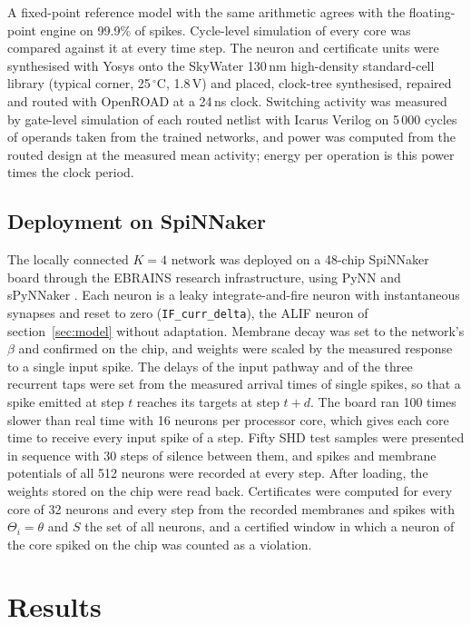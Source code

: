 \documentclass{iopjournal}
\begin{document}
A fixed-point reference model with the same arithmetic agrees with the floating-point engine on 99.9\% of spikes. Cycle-level simulation of every core was compared against it at every time step. The neuron and certificate units were synthesised with Yosys onto the SkyWater 130\,nm high-density standard-cell library (typical corner, 25\,$^{\circ}$C, 1.8\,V) and placed, clock-tree synthesised, repaired and routed with OpenROAD \cite{openroad} at a 24\,ns clock. Switching activity was measured by gate-level simulation of each routed netlist with Icarus Verilog on 5\,000 cycles of operands taken from the trained networks, and power was computed from the routed design at the measured mean activity; energy per operation is this power times the clock period.

\subsection{Deployment on SpiNNaker}
\label{sec:spinmethods}

The locally connected $K=4$ network was deployed on a 48-chip SpiNNaker board \cite{spinnaker} through the EBRAINS research infrastructure, using PyNN and sPyNNaker \cite{pynn,spynnaker}. Each neuron is a leaky integrate-and-fire neuron with instantaneous synapses and reset to zero (\texttt{IF\_curr\_delta}), the ALIF neuron of section~\ref{sec:model} without adaptation. Membrane decay was set to the network's $\beta$ and confirmed on the chip, and weights were scaled by the measured response to a single input spike. The delays of the input pathway and of the three recurrent taps were set from the measured arrival times of single spikes, so that a spike emitted at step $t$ reaches its targets at step $t+d$. The board ran 100 times slower than real time with 16 neurons per processor core, which gives each core time to receive every input spike of a step. Fifty SHD test samples were presented in sequence with 30 steps of silence between them, and spikes and membrane potentials of all 512 neurons were recorded at every step. After loading, the weights stored on the chip were read back. Certificates were computed for every core of 32 neurons and every step from the recorded membranes and spikes with $\Theta_i=\theta$ and $S$ the set of all neurons, and a certified window in which a neuron of the core spiked on the chip was counted as a violation.

\section{Results}
\end{document}
